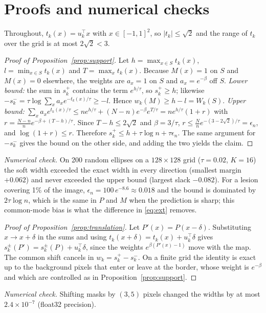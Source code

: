 \section{Proofs and numerical checks}\label{app:proofs}
Throughout, $t_k(x)=u_k^\top x$ with $x\in[-1,1]^2$, so $|t_k|\le\sqrt2$ and the range of $t_k$ over the grid is at most $2\sqrt2<3$.

\begin{proof}[Proof of Proposition~\ref{prop:support}]
Let $h=\max_{x\in S}t_k(x)$, $l=\min_{x\in S}t_k(x)$ and $T=\max_xt_k(x)$. Because $M(x)=1$ on $S$ and $M(x)=0$ elsewhere, the weights are $a_x=1$ on $S$ and $a_x=e^{-\beta}$ off $S$. \emph{Lower bound:} the sum in $s_k^{+}$ contains the term $e^{h/\tau}$, so $s_k^{+}\ge h$; likewise $-s_k^{-}=\tau\log\sum_xa_xe^{-t_k(x)/\tau}\ge-l$. Hence $w_k(M)\ge h-l=W_k(S)$. \emph{Upper bound:} $\sum_xa_xe^{t_k(x)/\tau}\le ne^{h/\tau}+(N-n)e^{-\beta}e^{T/\tau}=ne^{h/\tau}(1+r)$ with $r=\frac{N-n}{n}e^{-\beta+(T-h)/\tau}$. Since $T-h\le2\sqrt2$ and $\beta=3/\tau$, $r\le\frac{N}{n}e^{-(3-2\sqrt2)/\tau}=\epsilon_n$, and $\log(1+r)\le r$. Therefore $s_k^{+}\le h+\tau\log n+\tau\epsilon_n$. The same argument for $-s_k^{-}$ gives the bound on the other side, and adding the two yields the claim.
\end{proof}

\emph{Numerical check.} On 200 random ellipses on a $128\times128$ grid ($\tau=0.02$, $K=16$) the soft width exceeded the exact width in every direction (smallest margin $+0.062$) and never exceeded the upper bound (largest slack $-0.082$). For a lesion covering 1\% of the image, $\epsilon_n=100\,e^{-8.6}\approx0.018$ and the bound is dominated by $2\tau\log n$, which is the same in $P$ and $M$ when the prediction is sharp; this common-mode bias is what the difference in \eqref{eq:ext} removes.

\begin{proof}[Proof of Proposition~\ref{prop:translation}]
Let $P'(x)=P(x-\delta)$. Substituting $x\to x+\delta$ in the sums and using $t_k(x+\delta)=t_k(x)+u_k^\top\delta$ gives $s_k^{\pm}(P')=s_k^{\pm}(P)+u_k^\top\delta$, since the weights $e^{\beta(P'(x)-1)}$ move with the map. The common shift cancels in $w_k=s_k^{+}-s_k^{-}$. On a finite grid the identity is exact up to the background pixels that enter or leave at the border, whose weight is $e^{-\beta}$ and which are controlled as in Proposition~\ref{prop:support}.
\end{proof}
\emph{Numerical check.} Shifting masks by $(3,5)$ pixels changed the widths by at most $2.4\times10^{-7}$ (float32 precision).

